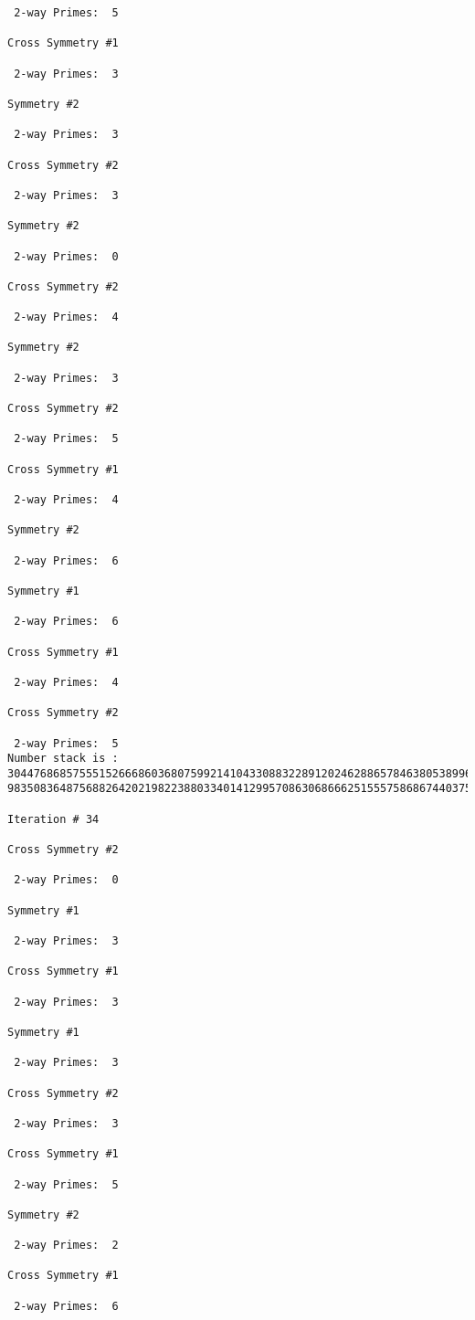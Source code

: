 \begin{verbatim}
 2-way Primes: 	5

Cross Symmetry #1

 2-way Primes: 	3

Symmetry #2

 2-way Primes: 	3

Cross Symmetry #2

 2-way Primes: 	3

Symmetry #2

 2-way Primes: 	0

Cross Symmetry #2

 2-way Primes: 	4

Symmetry #2

 2-way Primes: 	3

Cross Symmetry #2

 2-way Primes: 	5

Cross Symmetry #1

 2-way Primes: 	4

Symmetry #2

 2-way Primes: 	6

Symmetry #1

 2-way Primes: 	6

Cross Symmetry #1

 2-way Primes: 	4

Cross Symmetry #2

 2-way Primes: 	5
Number stack is :
30447686857555152666860368075992141043308832289120246288657846380538996794608835958544046240163340857
98350836487568826420219822388033401412995708630686662515557586867440375804336104264044585953880649769

Iteration #	34

Cross Symmetry #2

 2-way Primes: 	0

Symmetry #1

 2-way Primes: 	3

Cross Symmetry #1

 2-way Primes: 	3

Symmetry #1

 2-way Primes: 	3

Cross Symmetry #2

 2-way Primes: 	3

Cross Symmetry #1

 2-way Primes: 	5

Symmetry #2

 2-way Primes: 	2

Cross Symmetry #1

 2-way Primes: 	6


\end{verbatim}
